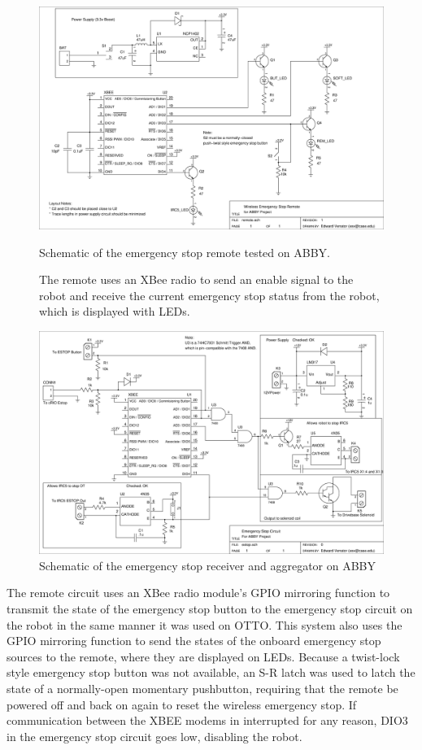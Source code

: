 \documentclass[]{cwru} %
\begin{document}
\begin{figure}[ht]
\centering
\includegraphics[width=6.0in]{estop_remote}
\caption{Schematic of the emergency stop remote tested on ABBY.}
\caption*{The remote uses an XBee radio to send an enable signal to 
the robot and receive the current emergency stop status from the robot, 
which is displayed with LEDs.}
\label{fig:estop-remote}
\end{figure}

\begin{figure}[ht]
\centering
\includegraphics[width=6.0in]{estop_receiver}
\caption{Schematic of the emergency stop receiver and aggregator on ABBY}
\label{fig:estop-receiver}
\end{figure}

The remote circuit uses an XBee radio module's GPIO mirroring function
to transmit the state of the emergency stop button to the emergency stop
circuit on the robot in the same manner it was used on OTTO. This system
also uses the GPIO mirroring function to send the states of the onboard
emergency stop sources to the remote, where they are displayed on LEDs.
Because a twist-lock style emergency stop button was not available, an
S-R latch was used to latch the state of a normally-open momentary
pushbutton, requiring that the remote be powered off and back on again
to reset the wireless emergency stop. If communication between the XBEE
modems in interrupted for any reason, DIO3 in the emergency stop circuit
goes low, disabling the robot.
\end{document}

